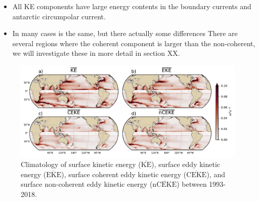 \documentclass[draft,linenumbers]{agujournal2019}
\newcommand{\MKE}{\overline{\textrm{KE}}}
\newcommand{\MEKE}{\overline{\textrm{EKE}}}
\newcommand{\MCEKE}{\overline{\textrm{CEKE}}}
\newcommand{\MnCEKE}{\overline{\textrm{nCEKE}}}
\begin{document}
	\begin{itemize}
		\item All KE components have large energy contents in the boundary currents and antarctic circumpolar current. 
		\item In many cases is the same, but there actually some differences There are several regions where the coherent component is larger than the non-coherent, we will investigate these in more detail in section XX.
	\end{itemize}

	\begin{figure}
	    \centering
	    \includegraphics[width=1\textwidth]{figures/mean_ke_maps_satellite.pdf}
	    \caption{Climatology of surface kinetic energy ($\MKE$), surface eddy kinetic energy ($\MEKE$), surface coherent eddy kinetic energy ($\MCEKE$), and surface non-coherent eddy kinetic energy ($\MnCEKE$) between 1993-2018.}
	    \label{fig:eddy_climatology}
	\end{figure}

\end{document}
